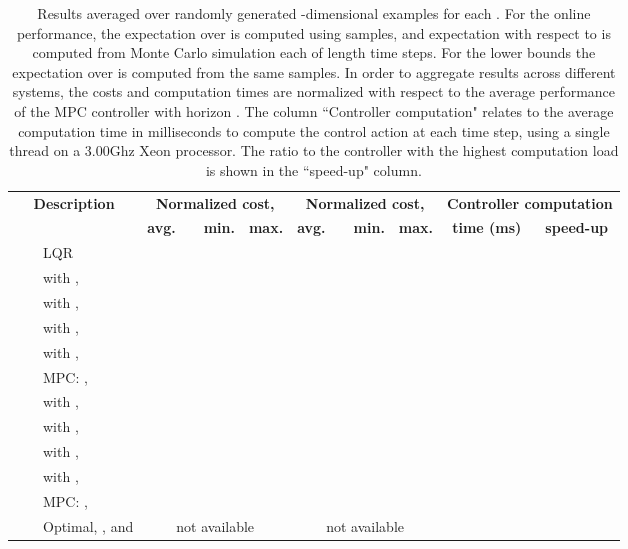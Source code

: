 \documentclass[journal]{IEEEtran}
\begin{document}
\begin{table*}[t] \centering
	\caption{Results averaged over  randomly generated -dimensional examples for each . For the online performance, the expectation over  is computed using  samples, and expectation with respect to  is computed from  Monte Carlo simulation each of length  time steps. For the lower bounds the expectation over  is computed from the same  samples. In order to aggregate results across different systems, the costs and computation times are normalized with respect to the average performance of the MPC controller with horizon . The column ``Controller computation" relates to the average computation time in milliseconds to compute the control action at each time step, using a single thread on a 3.00Ghz Xeon processor. The ratio to the controller with the highest computation load is shown in the ``speed-up" column.
	}
	
	\vspace{0.1cm}
	\begin{tabular}{|cc|l|cccc|cccc|cc|}
		\hline
		\multicolumn{3}{|c|}{\textbf{Description}} &
		\multicolumn{4}{|c|}{\textbf{Normalized cost, }} &
		\multicolumn{4}{|c|}{\textbf{Normalized cost, }} &
		\multicolumn{2}{|c|}{\textbf{Controller computation}}
		\\
		\multicolumn{3}{|c|}{} &
		\textbf{avg.} &
		\textbf{} &
		\textbf{min.} &
		\textbf{max.} &
		\textbf{avg.} &
		\textbf{} &
		\textbf{min.} &
		\textbf{max.} &
		\textbf{time (ms)} &
		\textbf{speed-up}
		\\
		\hline\hline
		\multirow{13}{0.0cm}{\rotatebox{90}{Online}} &
		\multirow{13}{0.1cm}{\rotatebox{90}{Performance}} &
		LQR &
		  &    &    &    &
		  &    &    &    &   & 
		\\
&&  with ,  &
		  &    &    &    &
		  &    &    &    &    &  
		\\
&&  with ,  &
		  &    &    &    &
		  &    &    &    &    &  
		\\
&&  with ,  &
		  &    &    &    &
		  &    &    &    &    &  
		\\
&&  with ,  &
		  &    &    &    &
		  &    &    &    &    &  
		\\
&& MPC: ,  &
		  &    &    &    &
		  &    &    &    &    &  
		\\
&&  with ,  &
		  &    &    &    &
		  &    &    &    &    &  
		\\
&&  with ,  &
		  &    &    &    &
		  &    &    &    &    &  
		\\
&&  with ,  &
		  &    &    &    &
		  &    &    &    &    &  
		\\
&&  with ,  &
		  &    &    &    &
		  &    &    &    &    &  
		\\
&& MPC: ,  &
		  &    &    &    &
		  &    &    &    &    &  
		\\
		\hline\hline
		&&Optimal, , and    &
		\multicolumn{4}{|c|}{not available} &
		\multicolumn{4}{|c|}{not available} &
		 &
		

\end{tabular}
\end{table*}
\end{document}
